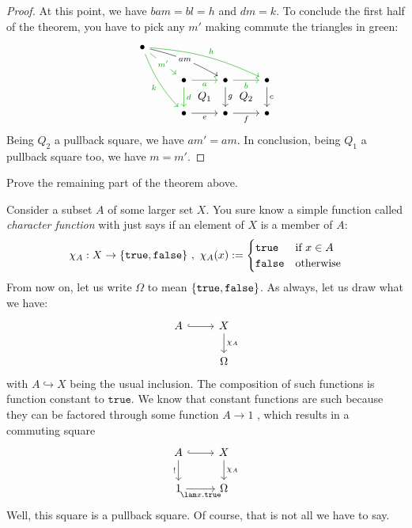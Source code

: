 \begin{proof}
At this point, we have \(b a m = b l = h\) and \(dm = k\). To conclude the first half of the theorem, you have to pick any \(m'\) making commute the triangles in green:
\[\begin{tikzcd}
\bullet \ar["h", bend left=10, drrr, green!65!black] \ar["k", bend right=10, ddr, swap, green!65!black] \ar["am" description, drr, bend left=8] \ar["{m'}" description, dr, green!65!black] & & & \\
& \bullet \ar["a", r, swap, green!65!black] \ar["d", d, green!65!black] \ar["{Q_1}", dr, phantom] & \bullet \ar["b", r, swap, green!65!black] \ar["g", d] \ar["{Q_2}", dr, phantom] & \bullet \ar["c", d]\\
& \bullet \ar["e", r, swap] & \bullet \ar["f", r, swap] & \bullet
\end{tikzcd}\]
Being \(Q_2\) a pullback square, we have \(am' = am\). In conclusion, being \(Q_1\) a pullback square too, we have \(m = m'\). 
\end{proof}

\begin{exercise}
Prove the remaining part of the theorem above.
\end{exercise}

\begin{example}
Consider a subset \(A\) of some larger set \(X\). You sure know a simple function called {\em character function} with just says if an element of \(X\) is a member of \(A\):
\[\chi_A : X \to \left\{\mathtt{true}, \mathtt{false}\right\}\,,\ \chi_A (x) := \begin{cases} \mathtt{true} & \text{if } x \in A \\ \mathtt{false} & \text{otherwise} \end{cases}\]
From now on, let us write \(\Omega\) to mean \(\left\{\mathtt{true}, \mathtt{false}\right\}\). As always, let us draw what we have:
\[\begin{tikzcd}
A \ar[r, hookrightarrow] & X \ar["{\chi_A}", d] \\
& \Omega
\end{tikzcd}\]
with \(A \hookrightarrow X\) being the usual inclusion. The composition of such functions is function constant to \(\mathtt{true}\). We know that constant functions are such because they can be factored through some function \(A \to 1\) , which results in a commuting square
\[\begin{tikzcd}
A \ar[r, hookrightarrow] \ar["!", d, swap] & X \ar["{\chi_A}", d] \\
1 \ar["{\lam x. \mathtt{true}}", r, swap] & \Omega
\end{tikzcd}\]
Well, this square is a pullback square. Of course, that is not all we have to say. 
\end{example}

